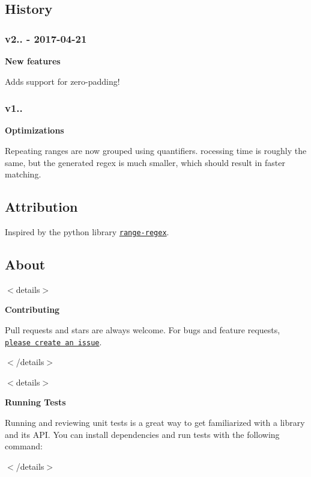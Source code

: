 \subsection*{History}

\subsubsection*{v2.. -\/ 2017-\/04-\/21}

{\bfseries New features}

Adds support for zero-\/padding!

\subsubsection*{v1..}

{\bfseries Optimizations}

Repeating ranges are now grouped using quantifiers. rocessing time is roughly the same, but the generated regex is much smaller, which should result in faster matching.

\subsection*{Attribution}

Inspired by the python library \href{https://github.com/dimka665/range-regex}{\tt range-\/regex}.

\subsection*{About}

$<$details$>$ 

{\bfseries Contributing}

Pull requests and stars are always welcome. For bugs and feature requests, \href{../../issues/new}{\tt please create an issue}.

$<$/details$>$

$<$details$>$ 

{\bfseries Running Tests}

Running and reviewing unit tests is a great way to get familiarized with a library and its A\+PI. You can install dependencies and run tests with the following command\+:




$<$/details$>$

